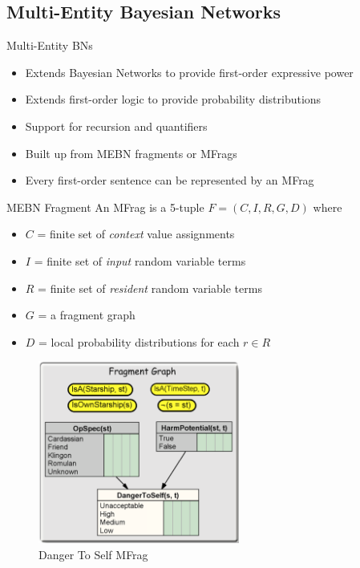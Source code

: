 \subsection{Multi-Entity Bayesian Networks}

\begin{frame}
	\begin{block}{Multi-Entity BNs~\cite{Laskey08}}
		\begin{itemize}
			\item Extends Bayesian Networks to provide first-order expressive power
			\item Extends first-order logic to provide probability distributions
			\item Support for recursion and quantifiers
			\item Built up from MEBN fragments or MFrags
			\item Every first-order sentence can be represented by an MFrag
		\end{itemize}
	\end{block}
\end{frame}

\begin{frame}
	\begin{block}{MEBN Fragment}
		An MFrag is a 5-tuple $F = ( C , I , R , G , D )$ where
		\begin{itemize}
			\item $C$ = finite set of \emph{context} value assignments
			\item $I$ = finite set of \emph{input} random variable terms
			\item $R$ = finite set of \emph{resident} random variable terms
			\item $G$ = a fragment graph
			\item $D$ = local probability distributions for each $r \in R$
		\end{itemize}
	\end{block}
\end{frame}

\begin{frame}
	\begin{figure}
		\centering
		\includegraphics[height=6cm]{images/startrekmfrag}
		\caption{Danger To Self MFrag}
	\end{figure}
\end{frame}

